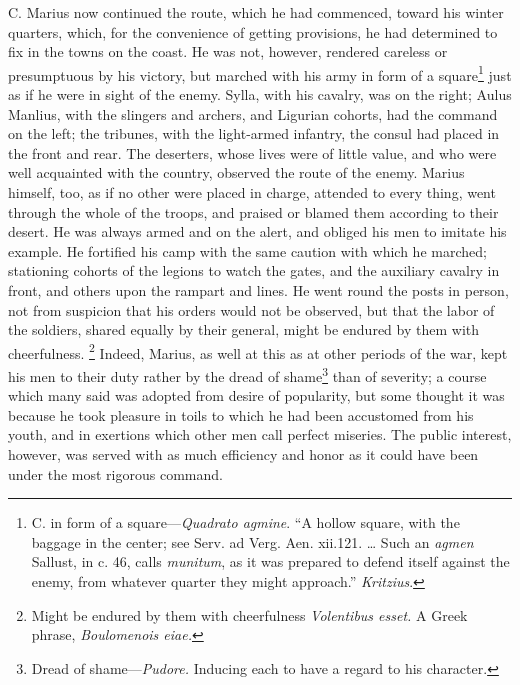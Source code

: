 C. Marius now continued the route, which he had commenced, toward his
winter quarters, which, for the convenience of getting provisions, he
had determined to fix in the towns on the coast. He was not, however,
rendered careless or presumptuous by his victory, but marched with his
army in form of a square\footnote{C. in form of a square—\emph{Quadrato agmine}. ``A hollow square,
with the baggage in the center; see Serv. ad Verg. Aen. xii.121. …
Such an \emph{agmen} Sallust, in c. 46, calls \emph{munitum}, as it was
prepared to defend itself against the enemy, from whatever quarter
they might approach.'' \emph{Kritzius}.} just as if he were in sight of the
enemy. Sylla, with his cavalry, was on the right; Aulus Manlius, with
the slingers and archers, and Ligurian cohorts, had the command on the
left; the tribunes, with the light-armed infantry, the consul had
placed in the front and rear. The deserters, whose lives were of
little value, and who were well acquainted with the country, observed
the route of the enemy. Marius himself, too, as if no other were
placed in charge, attended to every thing, went through the whole of
the troops, and praised or blamed them according to their desert. He
was always armed and on the alert, and obliged his men to imitate his
example. He fortified his camp with the same caution with which he
marched; stationing cohorts of the legions to watch the gates, and the
auxiliary cavalry in front, and others upon the rampart and lines. He
went round the posts in person, not from suspicion that his orders
would not be observed, but that the labor of the soldiers, shared
equally by their general, might be endured by them with cheerfulness.
\footnote{Might be endured by them with cheerfulness \emph{Volentibus
esset.} A Greek phrase, \emph{Boulomenois eiae.}} Indeed, Marius, as well at this as at other periods of the war,
kept his men to their duty rather by the dread of shame\footnote{Dread of shame—\emph{Pudore.} Inducing each to have a regard to
his character.} than of
severity; a course which many said was adopted from desire of popularity,
but some thought it was because he took pleasure in toils to which he had
been accustomed from his youth, and in exertions which other men call
perfect miseries. The public interest, however, was served with as much
efficiency and honor as it could have been under the most rigorous
command.

